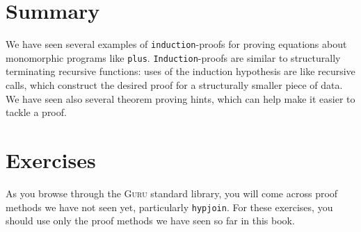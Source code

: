 \documentclass{book}[12pt]
\newcommand{\guru}[0]{\textsc{Guru}\xspace}
\begin{document}
\section{Summary}

We have seen several examples of \texttt{induction}-proofs for proving
equations about monomorphic programs like \texttt{plus}.
\texttt{Induction}-proofs are similar to structurally terminating
recursive functions: uses of the induction hypothesis are like
recursive calls, which construct the desired proof for a structurally
smaller piece of data.  We have seen also several theorem proving
hints, which can help make it easier to tackle a proof.

\section{Exercises}

As you browse through the \guru standard library, you will come across
proof methods we have not seen yet, particularly \texttt{hypjoin}.
For these exercises, you should use only the proof methods we have
seen so far in this book.
\end{document}
